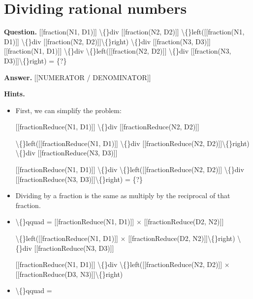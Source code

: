 \documentclass{article}
\begin{document}
\section*{Dividing rational numbers}
\textbf{Question.} [[fraction(N1, D1)]] \textbackslash\{\}div [[fraction(N2, D2)]]
                    \textbackslash\{\}left([[fraction(N1, D1)]] \textbackslash\{\}div [[fraction(N2, D2)]]\textbackslash\{\}right) \textbackslash\{\}div [[fraction(N3, D3)]]
                    [[fraction(N1, D1)]] \textbackslash\{\}div \textbackslash\{\}left([[fraction(N2, D2)]] \textbackslash\{\}div [[fraction(N3, D3)]]\textbackslash\{\}right) = \{?\}

\textbf{Answer.} [[NUMERATOR / DENOMINATOR]]

\textbf{Hints.}
\begin{itemize}
  \item First, we can simplify the problem:
                        
                            [[fractionReduce(N1, D1)]] \textbackslash\{\}div [[fractionReduce(N2, D2)]]
                            
                                \textbackslash\{\}left([[fractionReduce(N1, D1)]] \textbackslash\{\}div [[fractionReduce(N2, D2)]]\textbackslash\{\}right) \textbackslash\{\}div [[fractionReduce(N3, D3)]]
                            
                            
                                [[fractionReduce(N1, D1)]] \textbackslash\{\}div \textbackslash\{\}left([[fractionReduce(N2, D2)]] \textbackslash\{\}div [[fractionReduce(N3, D3)]]\textbackslash\{\}right)
                             = \{?\}
  \item Dividing by a fraction is the same as multiply by the reciprocal of that fraction.
  \item \textbackslash\{\}qquad =
                        [[fractionReduce(N1, D1)]] $\times$ [[fractionReduce(D2, N2)]]
                        
                            \textbackslash\{\}left([[fractionReduce(N1, D1)]] $\times$ [[fractionReduce(D2, N2)]]\textbackslash\{\}right) \textbackslash\{\}div [[fractionReduce(N3, D3)]]
                        
                        
                            [[fractionReduce(N1, D1)]] \textbackslash\{\}div \textbackslash\{\}left([[fractionReduce(N2, D2)]] $\times$ [[fractionReduce(D3, N3)]]\textbackslash\{\}right)
  \item \textbackslash\{\}qquad =
                        

\end{itemize}
\end{document}
